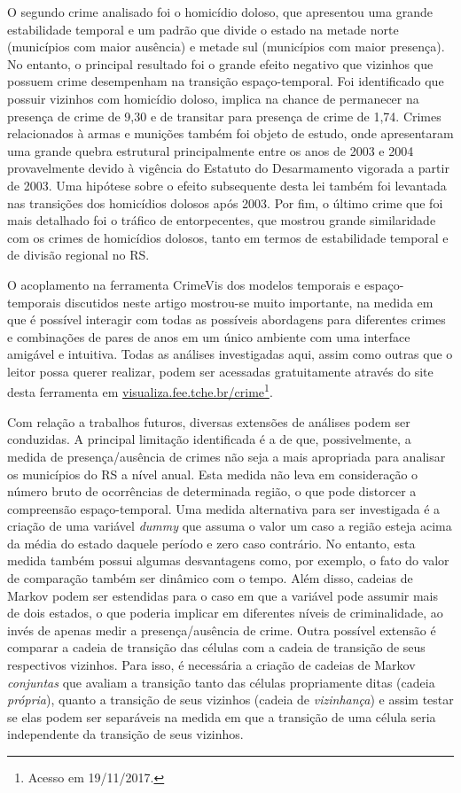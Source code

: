 \documentclass[12pt,openright,oneside,a4paper,english,french,spanish]{abntex2}
\numberwithin{table}{section} %
\numberwithin{figure}{section} %
\begin{document}
O segundo crime analisado foi o homicídio doloso, que apresentou uma grande estabilidade temporal e um padrão que divide o estado na metade norte (municípios com maior ausência) e metade sul (municípios com maior presença). No entanto, o principal resultado foi o grande efeito negativo que vizinhos que possuem crime desempenham na transição espaço-temporal. Foi identificado que possuir vizinhos com homicídio doloso, implica na chance de permanecer na presença de crime de 9,30 e de transitar para presença de crime de 1,74. Crimes relacionados à armas e munições também foi objeto de estudo, onde apresentaram uma grande quebra estrutural principalmente entre os anos de 2003 e 2004 provavelmente devido à vigência do Estatuto do Desarmamento vigorada a partir de 2003. Uma hipótese sobre o efeito subsequente desta lei também foi levantada nas transições dos homicídios dolosos após 2003. Por fim, o último crime que foi mais detalhado foi o tráfico de entorpecentes, que mostrou grande similaridade com os crimes de homicídios dolosos, tanto em termos de estabilidade temporal e de divisão regional no RS.

O acoplamento na ferramenta CrimeVis dos modelos temporais e espaço-temporais discutidos neste artigo mostrou-se muito importante, na medida em que é possível interagir com todas as possíveis abordagens para diferentes crimes e combinações de pares de anos em um único ambiente com uma interface amigável e intuitiva. Todas as análises investigadas aqui, assim como outras que o leitor possa querer realizar, podem ser acessadas gratuitamente através do site desta ferramenta em \href{http://visualiza.fee.tche.br/crime}{visualiza.fee.tche.br/crime}\footnote{Acesso em 19/11/2017.}.

Com relação a trabalhos futuros, diversas extensões de análises podem ser conduzidas. A principal limitação identificada é a de que, possivelmente, a medida de presença/ausência de crimes não seja a mais apropriada para analisar os municípios do RS a nível anual. Esta medida não leva em consideração o número bruto de ocorrências de determinada região, o que pode distorcer a compreensão espaço-temporal. Uma medida alternativa para ser investigada é a criação de uma variável \textit{dummy} que assuma o valor um caso a região esteja acima da média do estado daquele período e zero caso contrário. No entanto, esta medida também possui algumas desvantagens como, por exemplo, o fato do valor de comparação também ser dinâmico com o tempo. Além disso, cadeias de Markov podem ser estendidas para o caso em que a variável pode assumir mais de dois estados, o que poderia implicar em diferentes níveis de criminalidade, ao invés de apenas medir a presença/ausência de crime. Outra possível extensão é comparar a cadeia de transição das células com a cadeia de transição de seus respectivos vizinhos. Para isso, é necessária a criação de cadeias de Markov \textit{conjuntas} que avaliam a transição tanto das células propriamente ditas (cadeia \textit{própria}), quanto a transição de seus vizinhos (cadeia de \textit{vizinhança}) e assim testar se elas podem ser separáveis na medida em que a transição de uma célula seria independente da transição de seus vizinhos.
\end{document}

